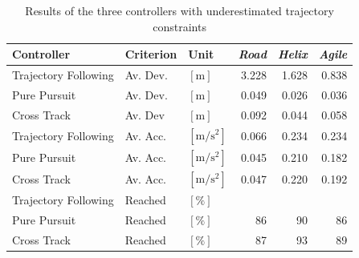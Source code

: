 \begin{table}[H]
\begin{center}
 \begin{tabular}{lll|rrr}
 \hline
 Controller & Criterion & Unit & \textit{Road} & \textit{Helix} & \textit{Agile} \\ \hline \hline
 Trajectory Following & Av. Dev. & $[\si{\meter}]$ & 3.228 & 1.628 & 0.838 \\
 Pure Pursuit         & Av. Dev. & $[\si{\meter}]$ & 0.049 & 0.026 & 0.036 \\
 Cross Track          & Av. Dev & $[\si{\meter}]$ &  0.092 & 0.044 & 0.058 \\
    
 Trajectory Following & Av. Acc. & $[\si{\meter\per\square\second}]$ & 0.066 & 0.234 & 0.234 \\
 Pure Pursuit         & Av. Acc. & $[\si{\meter\per\square\second}]$ & 0.045 & 0.210 & 0.182 \\
 Cross Track          & Av. Acc. & $[\si{\meter\per\square\second}]$ & 0.047 & 0.220 & 0.192 \\
 
 Trajectory Following & Reached & $[\si{\percent}]$ & \ktilde100 & \ktilde90 & \ktilde100 \\
 Pure Pursuit         & Reached & $[\si{\percent}]$ &  86 &  90 &  86 \\
 Cross Track          & Reached & $[\si{\percent}]$ &  87 &  93 &  89 \\
 \hline
 \end{tabular}
 \caption{Results of the three controllers with underestimated trajectory constraints}\vspace{1px}
 \label{tab:results_model_uncertainties}
\end{center}
\end{table}

